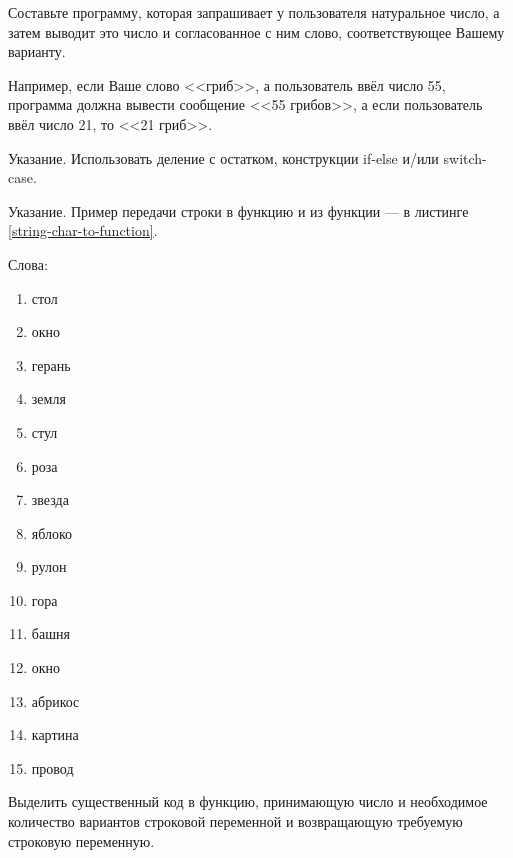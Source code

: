
\labtask

Составьте программу, которая запрашивает у пользователя натуральное число, а затем выводит это число и согласованное с ним слово, соответствующее Вашему варианту.

Например, если Ваше слово <<гриб>>, а пользователь ввёл число 55, программа должна вывести сообщение <<55 грибов>>, а если пользователь ввёл число 21, то <<21 гриб>>.

Указание. Использовать деление с остатком, конструкции if-else и/или switch-case.

Указание. Пример передачи строки в функцию и из функции --- в листинге \ref{string-char-to-function}.

Слова:

\begin{enumerate}

\item стол

\item окно

\item  герань

\item  земля

\item  стул

\item  роза

\item  звезда

\item  яблоко

\item  рулон

\item  гора

\item  башня

\item  окно

\item  абрикос

\item  картина

\item  провод



\end{enumerate}


\labtask

Выделить существенный код в функцию, принимающую число и необходимое количество вариантов строковой переменной и возвращающую требуемую строковую переменную.

